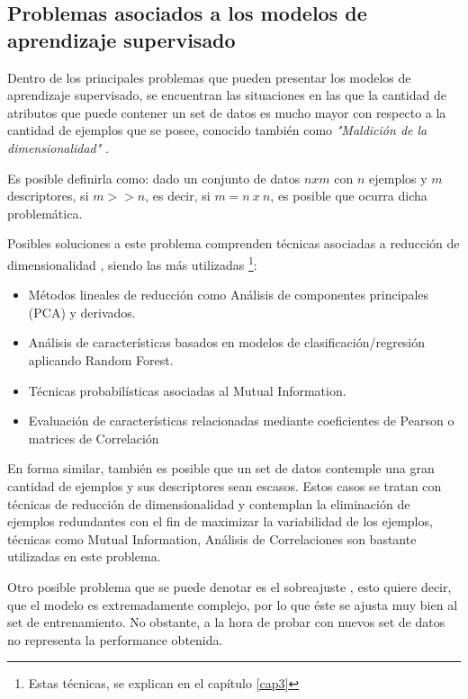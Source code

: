 \subsection{Problemas asociados a los modelos de aprendizaje supervisado \label{problemas}}

Dentro de los principales problemas que pueden presentar los modelos de aprendizaje supervisado, se encuentran las situaciones en las que la cantidad de atributos que puede contener un set de datos es mucho mayor con respecto a la cantidad de ejemplos que se posee, conocido también como \textit{"Maldición de la dimensionalidad"} \cite{indyk1998approximate}.

Es posible definirla como: dado un conjunto de datos $nxm$ con $n$ ejemplos y $m$ descriptores, si $m >> n$, es decir, si $m= n\ x\ n$, es posible que ocurra dicha problemática.

Posibles soluciones a este problema comprenden técnicas asociadas a reducción de dimensionalidad \cite{sarwar2000application, van2009dimensionality}, siendo las más utilizadas \footnote{Estas técnicas, se explican en el capítulo \ref{cap3}}:

\begin{itemize}
	
	\item Métodos lineales de reducción como Análisis de componentes principales (PCA) y derivados.
	\item Análisis de características basados en modelos de clasificación/regresión aplicando Random Forest.
	\item Técnicas probabilísticas asociadas al Mutual Information.
	\item Evaluación de características relacionadas mediante coeficientes de Pearson o matrices de Correlación
\end{itemize}
 
En forma similar, también es posible que un set de datos contemple una gran cantidad de ejemplos y sus descriptores sean escasos. Estos casos se tratan con técnicas de reducción de dimensionalidad y contemplan la eliminación de ejemplos redundantes con el fin de maximizar la variabilidad de los ejemplos, técnicas como Mutual Information, Análisis de Correlaciones son bastante utilizadas en este problema.

Otro posible problema que se puede denotar es el sobreajuste \cite{hawkins2004problem}, esto quiere decir, que el modelo es extremadamente complejo, por lo que éste se ajusta muy bien al set de entrenamiento. No obstante, a la hora de probar con nuevos set de datos no representa la performance obtenida. 

